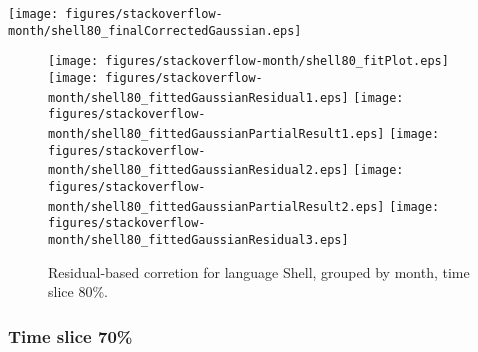 \begin{center}
{\texttt{[image: figures/stackoverflow-month/shell80\_finalCorrectedGaussian.eps]}}
\end{center}

\FloatBarrier

\begin{figure}[t]
\centering
{}
{\texttt{[image: figures/stackoverflow-month/shell80\_fitPlot.eps]}}
{\texttt{[image: figures/stackoverflow-month/shell80\_fittedGaussianResidual1.eps]}}
{\texttt{[image: figures/stackoverflow-month/shell80\_fittedGaussianPartialResult1.eps]}}
{\texttt{[image: figures/stackoverflow-month/shell80\_fittedGaussianResidual2.eps]}}
{\texttt{[image: figures/stackoverflow-month/shell80\_fittedGaussianPartialResult2.eps]}}
{\texttt{[image: figures/stackoverflow-month/shell80\_fittedGaussianResidual3.eps]}}
\caption{Residual-based corretion for language Shell, grouped by month, time slice 80\%.}
\end{figure}


\FloatBarrier


\subsubsection{Time slice 70\%}

